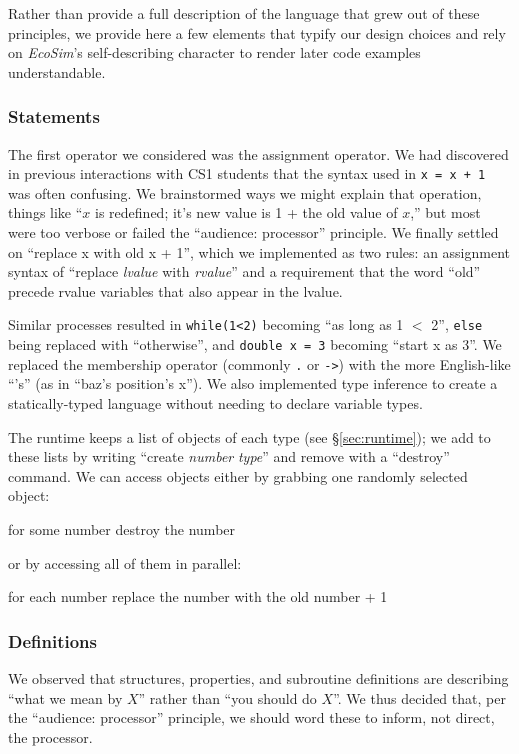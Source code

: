\documentclass{sig-alternate}
\newcommand{\INDSTATE}[1][1]{\STATE\hspace{#1\algorithmicindent}}
\newcommand{\EcoSim}{\emph{EcoSim}}
\newenvironment{snippet}{\begin{algorithmic}\sf}{\end{algorithmic}}
\newcommand{\code}[1]{``\textsf{#1}''}
\begin{document}
Rather than provide a full description of the language that grew out of these principles,
we provide here a few elements that typify our design choices
and rely on {\EcoSim}'s self-describing character 
to render later code examples understandable.

\subsubsection{Statements}
The first operator we considered was the assignment operator.
We had discovered in previous interactions with CS1 students
that the syntax used in \texttt{x = x + 1} was often confusing.
We brainstormed ways we might explain that operation,
things like ``$x$ is redefined; it's new value is 1 + the old value of $x$,''
but most were too verbose or failed the ``audience: processor'' principle.
We finally settled on \code{replace x with old x + 1},
which we implemented as two rules:
an assignment syntax of \code{replace {\it lvalue} with {\it rvalue}}
and a requirement that the word \code{old} precede rvalue variables that also appear in the lvalue.

Similar processes resulted in 
\texttt{while(1<2)} becoming \code{as long as 1 $<$ 2},
\texttt{else} being replaced with \code{otherwise}, 
and \texttt{double x = 3} becoming \code{start x as 3}.
We replaced the membership operator (commonly \texttt{.} or \mbox{\texttt{->}})
with the more English-like \code{'s} (as in \code{baz's position's x}).
We also implemented type inference to create a statically-typed language 
without needing to declare variable types.

The runtime keeps a list of objects of each type (see \S\ref{sec:runtime});
we add to these lists by writing \code{create {\it number} {\it type}} and remove with a \code{destroy} command.
We can access objects either by grabbing one randomly selected object:
\begin{snippet}
\STATE for some number
\INDSTATE destroy the number
\end{snippet}
or by accessing all of them in parallel:
\begin{snippet}
\STATE for each number
\INDSTATE replace the number with the old number + 1
\end{snippet}

\subsubsection{Definitions}
We observed that structures, properties, and subroutine definitions
are describing ``what we mean by $X$'' rather than ``you should do $X$''.
We thus decided that, per the ``audience: processor'' principle, 
we should word these to inform, not direct, the processor.
\end{document}
